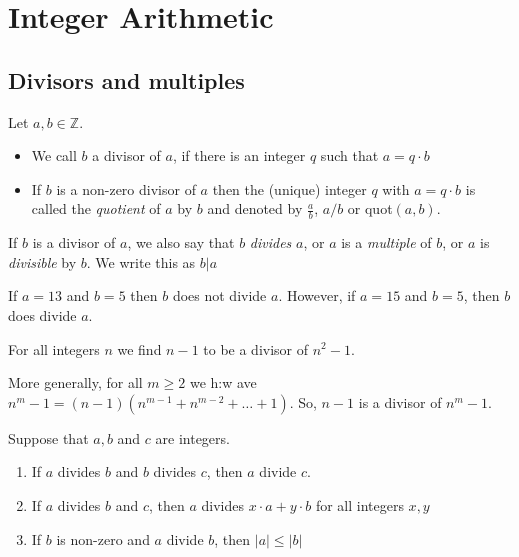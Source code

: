 \section{Integer Arithmetic}



\subsection{Divisors and multiples}
\begin{definition}
    Let $ a,b \in \mathbb{Z} $.
    \begin{itemize}
        \item We call $b$ a divisor of $a$, if there is an integer $q$ such that $a=q\cdot b$
        \item If $b$ is a non-zero divisor of $a$ then the (unique) integer $q$ with $ a=q\cdot b $ is called the \emph{quotient} of $a$ by $b$ and denoted by $ \frac{a}{b}$, $a/b$ or quot$(a,b)$.
    \end{itemize}
    If $b$ is a divisor of $a$, we also say that $b$ \emph{divides} $a$, or $a$ is a \emph{multiple} of $b$, or $a$ is \emph{divisible} by $b$. We write this as $ b|a $
\end{definition}

\begin{example}
    If $ a = 13 $ and $ b = 5 $ then $b$ does not divide $a$. However, if
    $ a = 15 $ and $ b = 5 $, then $b$ does divide $a$.
\end{example}

\begin{example}
    For all integers $n$ we find $ n-1 $ to be a divisor of $ n^2 - 1 $.

    More generally, for all $m \ge 2$ we h:w
    ave $ n^m - 1 =(n-1)(n^{m-1}+n^{m-2}+\dots+1) $.
    So, $ n-1 $ is a divisor of $ n^m -1 $.
\end{example}

\begin{lemma}
    Suppose that $a,b$ and $c$ are integers.
    \begin{enumerate}
        \item If $a$ divides $b$ and $b$ divides $c$, then $a$ divide $c$.
        \item If $a$ divides $b$ and $c$, then $a$ divides $x\cdot a + y\cdot b$
        for all integers $ x,y $
        \item If $b$ is non-zero and $a$ divide $b$, then $ |a| \le |b| $
    \end{enumerate}
\end{lemma}

